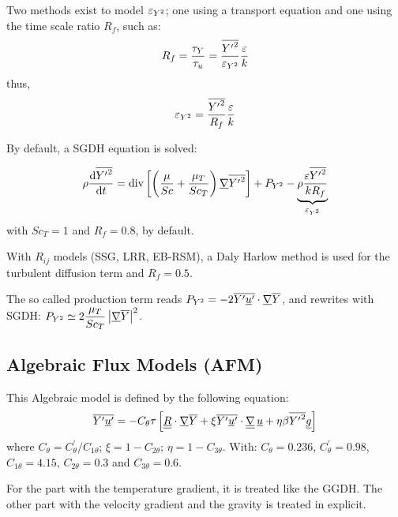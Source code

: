 Two methods exist to model $\varepsilon_{Y^2}$; one using a transport equation and one using the time scale ratio $R_f$, such as:
\[
R_f=\frac{\tau_Y}{\tau_u}=\frac{{\overline{{{Y}^\prime}^2}}}{\varepsilon_{Y^2} } \frac{\varepsilon }{k}
\]
thus,
\begin{equation}
\varepsilon_{Y^2}=\frac{{\overline{{{Y}^\prime}^2}}}{R_f} \frac{\varepsilon }{k}
\label{eq:eptt}
\end{equation}

By default, a SGDH equation is solved:

\begin{equation}
  \rho \frac{\mathrm{d} {\overline{{{Y}^\prime}^2}}}{\mathrm{d} t}=\text{div}\,{ \left[ \left(  \dfrac{\mu}{Sc}   +\dfrac{\mu_T}{Sc_T}  \right)\underline{\nabla}{{\overline{{{Y}^\prime}^2}}} \right]}
  +
  P_{Y^2}
  - \underbrace{\rho \frac{\varepsilon {\overline{{{Y}^\prime}^2}}}{k R_f}}_{\varepsilon_{Y^2}} \label{eq:variance_CS}
\end{equation}
with $Sc_T=1$ and $R_f=0.8$, by default.

With $R_{ij}$ models (SSG, LRR, EB-RSM), a Daly Harlow method is used for the turbulent diffusion term and $R_f=0.5$.

The so called production term reads $ P_{Y^2} = -2 {\overline{{{Y}^\prime} {{\underline{u}}^\prime}}}\cdot \underline{\nabla} {\overline{Y}} $, and rewrites with SGDH: $ P_{Y^2} \simeq 2 \dfrac{\mu_T}{Sc_T} \left|\underline{\nabla}{{\overline{Y}}}\right|^2$.

\subsection{Algebraic Flux Models (AFM)}

This Algebraic model is defined by the following equation:
\begin{equation}\label{eq:AFM}
 {\overline{{{Y}^\prime}{{\underline{u}}^\prime}}} = - C_\theta \tau \left[
	\underline{\underline{R}}\cdot\underline{\nabla}{{\overline{Y}}}
	+ \xi {\overline{{{Y}^\prime}{{\underline{u}}^\prime}}}\cdot \underline{\underline{{\nabla}}}{\,\underline{u}}
	+ \eta \beta {\overline{{{Y}^\prime}^2}}\underline{g}
	\right]
\end{equation}
%
where $C_{\theta } = C_{\theta }^{'} / C_{1 \theta}$; $\xi =1-C_{2 \theta}$; $\eta =1-C_{3 \theta}$. With: $C_{\theta }=0.236$, $ C_{\theta }^{'}=0.98$, $C_{1 \theta}=4.15$, $C_{2 \theta}=0.3$ and $C_{3 \theta}=0.6$.

For the part with the temperature gradient, it is treated like the GGDH. The other part with the velocity gradient and the gravity is treated in explicit.

